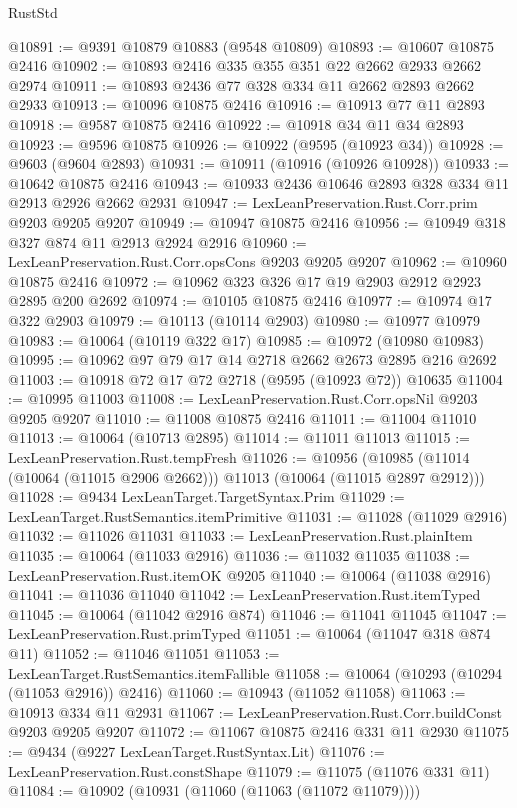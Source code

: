 \begin{lexlean}{RustStd}
\begin{coremodule}
@10891 := @9391 @10879 @10883 (@9548 @10809)
@10893 := @10607 @10875 @2416
@10902 := @10893 @2416 @335 @355 @351 @22 @2662 @2933 @2662 @2974
@10911 := @10893 @2436 @77 @328 @334 @11 @2662 @2893 @2662 @2933
@10913 := @10096 @10875 @2416
@10916 := @10913 @77 @11 @2893
@10918 := @9587 @10875 @2416
@10922 := @10918 @34 @11 @34 @2893
@10923 := @9596 @10875
@10926 := @10922 (@9595 (@10923 @34))
@10928 := @9603 (@9604 @2893)
@10931 := @10911 (@10916 (@10926 @10928))
@10933 := @10642 @10875 @2416
@10943 := @10933 @2436 @10646 @2893 @328 @334 @11 @2913 @2926 @2662 @2931
@10947 := LexLeanPreservation.Rust.Corr.prim @9203 @9205 @9207
@10949 := @10947 @10875 @2416
@10956 := @10949 @318 @327 @874 @11 @2913 @2924 @2916
@10960 := LexLeanPreservation.Rust.Corr.opsCons @9203 @9205 @9207
@10962 := @10960 @10875 @2416
@10972 := @10962 @323 @326 @17 @19 @2903 @2912 @2923 @2895 @200 @2692
@10974 := @10105 @10875 @2416
@10977 := @10974 @17 @322 @2903
@10979 := @10113 (@10114 @2903)
@10980 := @10977 @10979
@10983 := @10064 (@10119 @322 @17)
@10985 := @10972 (@10980 @10983)
@10995 := @10962 @97 @79 @17 @14 @2718 @2662 @2673 @2895 @216 @2692
@11003 := @10918 @72 @17 @72 @2718 (@9595 (@10923 @72)) @10635
@11004 := @10995 @11003
@11008 := LexLeanPreservation.Rust.Corr.opsNil @9203 @9205 @9207
@11010 := @11008 @10875 @2416
@11011 := @11004 @11010
@11013 := @10064 (@10713 @2895)
@11014 := @11011 @11013
@11015 := LexLeanPreservation.Rust.tempFresh
@11026 := @10956
    (@10985 (@11014 (@10064 (@11015 @2906 @2662))) @11013 (@10064 (@11015 @2897 @2912)))
@11028 := @9434 LexLeanTarget.TargetSyntax.Prim
@11029 := LexLeanTarget.RustSemantics.itemPrimitive
@11031 := @11028 (@11029 @2916)
@11032 := @11026 @11031
@11033 := LexLeanPreservation.Rust.plainItem
@11035 := @10064 (@11033 @2916)
@11036 := @11032 @11035
@11038 := LexLeanPreservation.Rust.itemOK @9205
@11040 := @10064 (@11038 @2916)
@11041 := @11036 @11040
@11042 := LexLeanPreservation.Rust.itemTyped
@11045 := @10064 (@11042 @2916 @874)
@11046 := @11041 @11045
@11047 := LexLeanPreservation.Rust.primTyped
@11051 := @10064 (@11047 @318 @874 @11)
@11052 := @11046 @11051
@11053 := LexLeanTarget.RustSemantics.itemFallible
@11058 := @10064 (@10293 (@10294 (@11053 @2916)) @2416)
@11060 := @10943 (@11052 @11058)
@11063 := @10913 @334 @11 @2931
@11067 := LexLeanPreservation.Rust.Corr.buildConst @9203 @9205 @9207
@11072 := @11067 @10875 @2416 @331 @11 @2930
@11075 := @9434 (@9227 LexLeanTarget.RustSyntax.Lit)
@11076 := LexLeanPreservation.Rust.constShape
@11079 := @11075 (@11076 @331 @11)
@11084 := @10902 (@10931 (@11060 (@11063 (@11072 @11079))))

\end{coremodule}
\end{lexlean}
